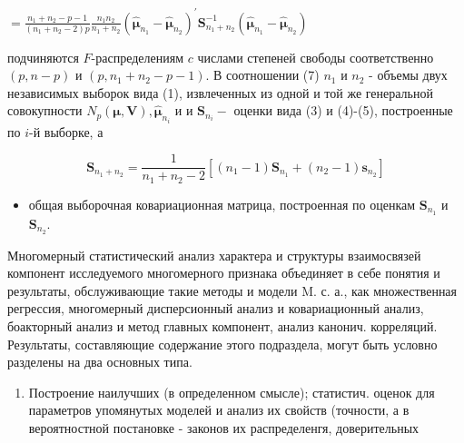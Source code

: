 \documentclass[10pt]{article}
\begin{document}
$=\frac{n_{1}+n_{2}-p-1}{\left(n_{1}+n_{2}-2\right) p} \frac{n_{1} n_{2}}{n_{1}+n_{2}}\left(\hat{\boldsymbol{\mu}}_{n_{1}}-\hat{\boldsymbol{\mu}}_{n_{2}}\right)^{\prime} \boldsymbol{S}_{n_{1}+n_{2}}^{-1}\left(\hat{\boldsymbol{\mu}}_{n_{1}}-\hat{\boldsymbol{\mu}}_{n_{2}}\right)$



подчиняются $F$-распределениям $c$ числами степеней свободы соответственно $(p, n-p)$ и $\left(p, n_{1}+n_{2}-p-1\right)$. В соотношении (7) $n_{1}$ и $n_{2}$ - объемы двух независимых выборок вида (1), извлеченных из одной и той же генеральной совокупности $N_{p}(\boldsymbol{\mu}, \boldsymbol{V}), \hat{\boldsymbol{\mu}}_{n_{i}}$ и и $\boldsymbol{S}_{n_{i}}-$ оценки вида (3) и (4)-(5), построенные по $i$-й выборке, а



\[

\boldsymbol{S}_{n_{1}+n_{2}}=\frac{1}{n_{1}+n_{2}-2}\left[\left(n_{1}-1\right) \boldsymbol{S}_{n_{1}}+\left(n_{2}-1\right) \boldsymbol{s}_{n_{2}}\right]

\]



\begin{itemize}

  \item общая выборочная ковариационная матрица, построенная по оценкам $\boldsymbol{S}_{n_{1}}$ и $\boldsymbol{S}_{n_{2}}$.

\end{itemize}



Многомерный статистический анализ характера и структуры взаимосвязей компонент исследуемого многомерного признака объединяет в себе понятия и результаты, обслуживающие такие методы и модели M. с. а., как множественная регрессия, многомерный дисперсионный анализ и ковариационный анализ, боакторный анализ и метод главных компонент, анализ канонич. корреляций. Результаты, составляющие содержание этого подраздела, могут быть условно разделены на два основных типа.



\begin{enumerate}

  \item Построение наилучших (в определенном смысле); статистич. оценок для параметров упомянутых моделей и анализ их свойств (точности, а в вероятностной постановке - законов их распределенгя, доверительных

\end{enumerate}
\end{document}
